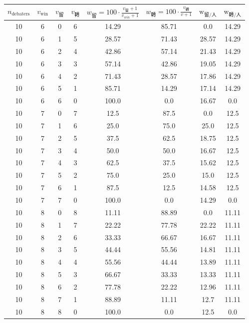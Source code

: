 \documentclass[9pt]{article}
\begin{document}
\begin{table}[h]
    \centering
    \small
    \begin{threeparttable}
    \begin{tabular}{cccccccc}
    \toprule
    $n_{\text{debaters}}$ & $v_{\text{win}}$ & $v_{\text{留}}$ & $v_{\text{轉}}$ & $w_{\text{留}} = 100 \cdot \frac{v_{\text{留}}+1}{v_{win}+1} $ & $w_{\text{轉}} = 100\cdot\frac{v_{\text{轉}}}{v+1}$ & $\text{w}_{\text{留}/\text{人} }$ & $\text{w}_{\text{轉}/\text{人}}$ \\
    \midrule
10 & 6 & 0 & 6 & 14.29 & 85.71 & 0.0 & 14.29 \\
10 & 6 & 1 & 5 & 28.57 & 71.43 & 28.57 & 14.29 \\
10 & 6 & 2 & 4 & 42.86 & 57.14 & 21.43 & 14.29 \\
10 & 6 & 3 & 3 & 57.14 & 42.86 & 19.05 & 14.29 \\
10 & 6 & 4 & 2 & 71.43 & 28.57 & 17.86 & 14.29 \\
10 & 6 & 5 & 1 & 85.71 & 14.29 & 17.14 & 14.29 \\
10 & 6 & 6 & 0 & 100.0 & 0.0 & 16.67 & 0.0 \\
10 & 7 & 0 & 7 & 12.5 & 87.5 & 0.0 & 12.5 \\
10 & 7 & 1 & 6 & 25.0 & 75.0 & 25.0 & 12.5 \\
10 & 7 & 2 & 5 & 37.5 & 62.5 & 18.75 & 12.5 \\
10 & 7 & 3 & 4 & 50.0 & 50.0 & 16.67 & 12.5 \\
10 & 7 & 4 & 3 & 62.5 & 37.5 & 15.62 & 12.5 \\
10 & 7 & 5 & 2 & 75.0 & 25.0 & 15.0 & 12.5 \\
10 & 7 & 6 & 1 & 87.5 & 12.5 & 14.58 & 12.5 \\
10 & 7 & 7 & 0 & 100.0 & 0.0 & 14.29 & 0.0 \\
10 & 8 & 0 & 8 & 11.11 & 88.89 & 0.0 & 11.11 \\
10 & 8 & 1 & 7 & 22.22 & 77.78 & 22.22 & 11.11 \\
10 & 8 & 2 & 6 & 33.33 & 66.67 & 16.67 & 11.11 \\
10 & 8 & 3 & 5 & 44.44 & 55.56 & 14.81 & 11.11 \\
10 & 8 & 4 & 4 & 55.56 & 44.44 & 13.89 & 11.11 \\
10 & 8 & 5 & 3 & 66.67 & 33.33 & 13.33 & 11.11 \\
10 & 8 & 6 & 2 & 77.78 & 22.22 & 12.96 & 11.11 \\
10 & 8 & 7 & 1 & 88.89 & 11.11 & 12.7 & 11.11 \\
10 & 8 & 8 & 0 & 100.0 & 0.0 & 12.5 & 0.0 \\

\end{tabular}
\end{threeparttable}
\end{table}
\end{document}
